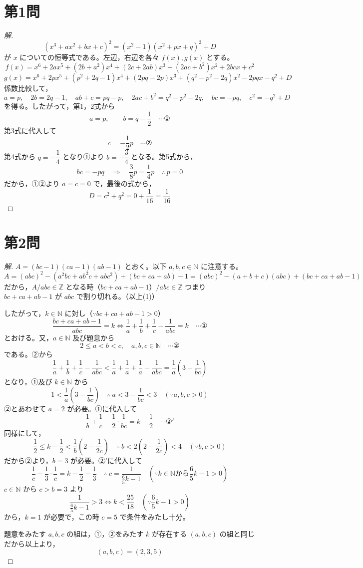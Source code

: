 \documentclass[../main.tex]{subfiles}
\begin{document}
\section*{第1問}

\begin{proof}[解]
  \[
    (x^3+ax^2+bx+c)^2=(x^2-1)(x^2+px+q)^2+D
  \]
  が $x$ についての恒等式である。左辺，右辺を各々 $f(x),g(x)$ とする。
  \[
    f(x)=x^6+2ax^5+(2b+a^2)x^4+(2c+2ab)x^3+(2ac+b^2)x^2+2bcx+c^2
  \]
  \[
    g(x)=x^6+2px^5+(p^2+2q-1)x^4+(2pq-2p)x^3+(q^2-p^2-2q)x^2-2pqx-q^2+D
  \]
  係数比較して，
  \[
    a=p, \quad 2b=2q-1, \quad ab+c=pq-p, \quad 2ac+b^2=q^2-p^2-2q, \quad bc=-pq, \quad c^2=-q^2+D
  \]
  を得る。したがって，第1，2式から
  \[
    a=p, \qquad b=q-\frac12 \quad \cdots \text{①}
  \]
  第3式に代入して
  \[
    c=-\frac12 p \quad \cdots \text{②}
  \]
  第4式から $q=-\dfrac14$ となり①より $b=-\dfrac34$ となる。第5式から，
  \[
    bc=-pq \quad\Longrightarrow\quad \frac38p=\frac14p \quad\therefore\ p=0
  \]
  だから，①②より $a=c=0$ で，最後の式から，
  \[
    D=c^2+q^2=0+\frac{1}{16}=\frac{1}{16}
  \]
\end{proof}

\newpage

\section*{第2問}

\begin{proof}[解]
  $A=(bc-1)(ca-1)(ab-1)$ とおく。以下 $a,b,c\in\mathbb{N}$ に注意する。
  \[
    A=(abc)^2-(a^2bc+ab^2c+abc^2)+(bc+ca+ab)-1 = (abc)^2-(a+b+c)(abc)+(bc+ca+ab-1)
  \]
  だから，$A/abc\in\mathbb{Z}$ となる時（$bc+ca+ab-1$）$/abc\in\mathbb{Z}$ つまり $bc+ca+ab-1$ が $abc$ で割り切れる。（以上(1)）

  したがって，$k\in\mathbb{N}$ に対し（$\because bc+ca+ab-1>0$）
  \[
    \frac{bc+ca+ab-1}{abc}=k \iff \frac1a+\frac1b+\frac1c-\frac{1}{abc}=k \quad \cdots \text{①}
  \]
  とおける。又，$a\in\mathbb{N}$ 及び題意から
  \[
    2\le a<b<c, \quad a,b,c\in\mathbb{N} \quad \cdots \text{②}
  \]
  である。②から
  \[
    \frac1a+\frac1b+\frac1c-\frac1{abc}<\frac1a+\frac1a+\frac1a-\frac1{abc}=\frac1a\left(3-\frac1{bc}\right)
  \]
  となり，①及び $k\in\mathbb{N}$ から
  \[
    1<\frac1a\left(3-\frac1{bc}\right) \quad\therefore\ a<3-\frac1{bc}<3 \quad (\because a,b,c>0)
  \]
  ②とあわせて $a=2$ が必要。①に代入して
  \[
    \frac1b+\frac1c-\frac12\cdot\frac1{bc}=k-\frac12 \quad \cdots \text{②}'
  \]
  同様にして，
  \[
    \frac12\le k-\frac12<\frac1b\left(2-\frac{1}{2c}\right) \quad\therefore\ b<2\left(2-\frac{1}{2c}\right)<4 \quad (\because b,c>0)
  \]
  だから②より，$b=3$ が必要。②'に代入して
  \[
    \frac1c-\frac13\cdot\frac1c=k-\frac12-\frac13 \quad\therefore\ c=\frac{1}{\frac65k-1} \quad \left(\because k\in\mathbb{N}\text{から}\frac65k-1>0\right)
  \]
  $c\in\mathbb{N}$ から $c>b=3$ より
  \[
    \frac{1}{\frac65k-1}>3 \iff k<\frac{25}{18} \quad \left(\because\frac65k-1>0\right)
  \]
  から，$k=1$ が必要で，この時 $c=5$ で条件をみたし十分。

  題意をみたす $a,b,c$ の組は，①，②をみたす $k$ が存在する $(a,b,c)$ の組と同じだから以上より，
  \[
    (a,b,c)=(2,3,5)
  \]
\end{proof}
\end{document}
